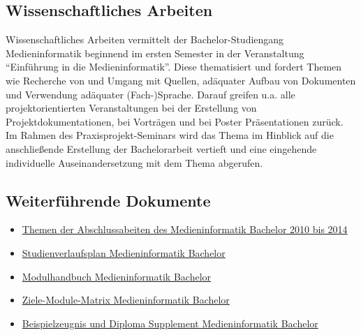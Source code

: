 \subsection{Wissenschaftliches
Arbeiten\label{/mi-2017/selbstbericht/0400-studiengangskonzept/0000-studiengangskonzept}}\label{wissenschaftliches-arbeitenpathlabelmi-2017selbstbericht0400-studiengangskonzept0000-studiengangskonzept}

Wissenschaftliches Arbeiten vermittelt der Bachelor-Studiengang
Medieninformatik beginnend im ersten Semester in der Veranstaltung
``Einführung in die Medieninformatik''. Diese thematisiert und fordert
Themen wie Recherche von und Umgang mit Quellen, adäquater Aufbau von
Dokumenten und Verwendung adäquater (Fach-)Sprache. Darauf greifen u.a.
alle projektorientierten Veranstaltungen bei der Erstellung von
Projektdokumentationen, bei Vorträgen und bei Poster Präsentationen
zurück. Im Rahmen des Praxisprojekt-Seminars wird das Thema im Hinblick
auf die anschließende Erstellung der Bachelorarbeit vertieft und eine
eingehende individuelle Auseinandersetzung mit dem Thema abgerufen.

\subsection{Weiterführende
Dokumente\label{/mi-2017/selbstbericht/0400-studiengangskonzept/0000-studiengangskonzept}}\label{weiterfuxfchrende-dokumentepathlabelmi-2017selbstbericht0400-studiengangskonzept0000-studiengangskonzept}

\begin{itemize}
\tightlist
\item
  \href{https://th-koeln.github.io/mi-2017/anhaenge/ba-abschlussarbeiten_2010-2014_.pdf}{Themen der
  Abschlussabeiten des Medieninformatik Bachelor 2010 bis 2014}
\item
  \href{https://th-koeln.github.io/mi-2017/anhaenge/ba-studienverlaufsplan.pdf}{Studienverlaufsplan
  Medieninformatik Bachelor}
\item
  \href{https://th-koeln.github.io/mi-2017/download/modulbeschreibungen-bachelor.pdf}{Modulhandbuch
  Medieninformatik Bachelor}
\item
  \href{https://th-koeln.github.io/mi-2017/anhaenge/ba-Ziele-Module-Matrix-Medieninformatik-Bachelor.pdf}{Ziele-Module-Matrix
  Medieninformatik Bachelor}
\item
  \href{https://th-koeln.github.io/mi-2017/anhaenge/ba-zeugnis.pdf}{Beispielzeugnis und Diploma
  Supplement Medieninformatik Bachelor}
\end{itemize}

